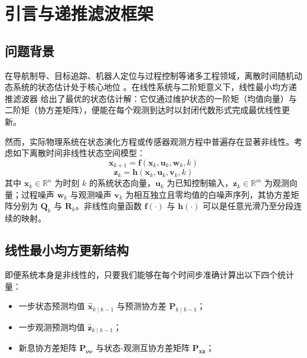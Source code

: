 \section{引言与递推滤波框架}\label{sec:intro}

\subsection{问题背景}\label{sec:background}

在导航制导、目标追踪、机器人定位与过程控制等诸多工程领域，离散时间随机动态系统的状态估计处于核心地位 \cite{r02,r03}。在线性系统与二阶矩意义下，线性最小均方递推滤波器 \cite{r01} 给出了最优的状态估计解：它仅通过维护状态的一阶矩（均值向量）与二阶矩（协方差矩阵），便能在每个观测到达时以封闭代数形式完成最优线性更新。

然而，实际物理系统在状态演化方程或传感器观测方程中普遍存在显著非线性。考虑如下离散时间非线性状态空间模型：
\begin{equation}\label{eq:1}
\bm{x}_{k+1} = \bm{f}(\bm{x}_k, \bm{u}_k, \bm{w}_k, k)
\end{equation}
\begin{equation}\label{eq:2}
\bm{z}_k = \bm{h}(\bm{x}_k, \bm{u}_k, \bm{v}_k, k)
\end{equation}
其中 $\bm{x}_k \in \mathbb{R}^n$ 为时刻 $k$ 的系统状态向量，$\bm{u}_k$ 为已知控制输入，$\bm{z}_k \in \mathbb{R}^m$ 为观测向量；过程噪声 $\bm{w}_k$ 与观测噪声 $\bm{v}_k$ 为相互独立且零均值的白噪声序列，其协方差矩阵分别为 $\bm{Q}_k$ 与 $\bm{R}_k$。非线性向量函数 $\bm{f}(\cdot)$ 与 $\bm{h}(\cdot)$ 可以是任意光滑乃至分段连续的映射。

\subsection{线性最小均方更新结构}\label{sec:lmmse}

即便系统本身是非线性的，只要我们能够在每个时间步准确计算出以下四个统计量：

\begin{itemize}
\item 一步状态预测均值 $\hat{\bm{x}}_{k\mid k-1}$ 与预测协方差 $\bm{P}_{k\mid k-1}$；
\item 一步观测预测均值 $\hat{\bm{z}}_{k\mid k-1}$；
\item 新息协方差矩阵 $\bm{P}_{\bm{\nu}\bm{\nu}}$ 与状态-观测互协方差矩阵 $\bm{P}_{\bm{x}\bm{z}}$；
\end{itemize}

